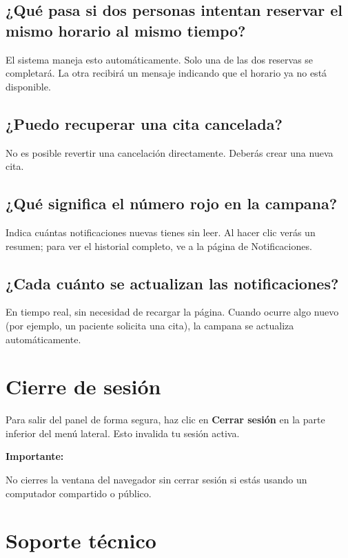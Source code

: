 \documentclass[12pt,a4paper]{article}
\newenvironment{importante}{%
  \begin{mdframed}[backgroundcolor=grayLight,linecolor=dangerColor,linewidth=1.5pt,innerleftmargin=10pt]
  \textcolor{dangerColor}{\textbf{Importante:}} 
}{%
  \end{mdframed}
}
\begin{document}
\subsection{¿Qué pasa si dos personas intentan reservar el mismo horario al mismo tiempo?}
El sistema maneja esto automáticamente. Solo una de las dos reservas se completará.
La otra recibirá un mensaje indicando que el horario ya no está disponible.

\subsection{¿Puedo recuperar una cita cancelada?}
No es posible revertir una cancelación directamente. Deberás crear una nueva cita.

\subsection{¿Qué significa el número rojo en la campana?}
Indica cuántas notificaciones nuevas tienes sin leer. Al hacer clic verás un
resumen; para ver el historial completo, ve a la página de Notificaciones.

\subsection{¿Cada cuánto se actualizan las notificaciones?}
En tiempo real, sin necesidad de recargar la página. Cuando ocurre algo nuevo
(por ejemplo, un paciente solicita una cita), la campana se actualiza automáticamente.

\section{Cierre de sesión}

Para salir del panel de forma segura, haz clic en \textbf{Cerrar sesión} en la
parte inferior del menú lateral. Esto invalida tu sesión activa.

\begin{importante}
  No cierres la ventana del navegador sin cerrar sesión si estás usando un
  computador compartido o público.
\end{importante}

\section{Soporte técnico}
\end{document}
